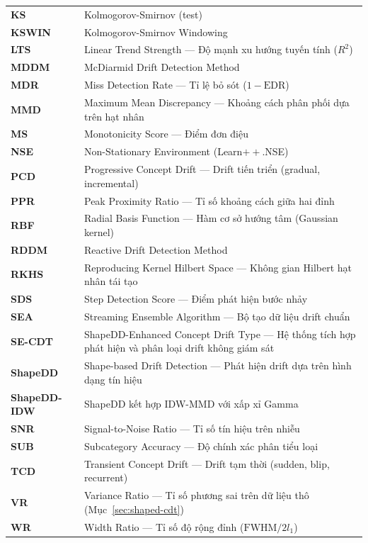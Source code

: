 \begin{longtable}[c]{|>{\bfseries}l|p{12cm}|}
	KS & Kolmogorov-Smirnov (test) \\
	KSWIN & Kolmogorov-Smirnov Windowing \\
	LTS & Linear Trend Strength --- Độ mạnh xu hướng tuyến tính ($R^2$) \\
	MDDM & McDiarmid Drift Detection Method \\
	MDR & Miss Detection Rate --- Tỉ lệ bỏ sót ($1 - \text{EDR}$) \\
	MMD & Maximum Mean Discrepancy --- Khoảng cách phân phối dựa trên hạt nhân \\
	MS & Monotonicity Score --- Điểm đơn điệu \\
	NSE & Non-Stationary Environment (Learn$++$.NSE) \\
	PCD & Progressive Concept Drift --- Drift tiến triển (gradual, incremental) \\
	PPR & Peak Proximity Ratio --- Tỉ số khoảng cách giữa hai đỉnh \\
	RBF & Radial Basis Function --- Hàm cơ sở hướng tâm (Gaussian kernel) \\
	RDDM & Reactive Drift Detection Method \\
	RKHS & Reproducing Kernel Hilbert Space --- Không gian Hilbert hạt nhân tái tạo \\
	SDS & Step Detection Score --- Điểm phát hiện bước nhảy \\
	SEA & Streaming Ensemble Algorithm --- Bộ tạo dữ liệu drift chuẩn \\
	SE-CDT & ShapeDD-Enhanced Concept Drift Type --- Hệ thống tích hợp phát hiện và phân loại drift không giám sát \\
	ShapeDD & Shape-based Drift Detection --- Phát hiện drift dựa trên hình dạng tín hiệu \\
	ShapeDD-IDW & ShapeDD kết hợp IDW-MMD với xấp xỉ Gamma \\
	SNR & Signal-to-Noise Ratio --- Tỉ số tín hiệu trên nhiễu \\
	SUB & Subcategory Accuracy --- Độ chính xác phân tiểu loại \\
	TCD & Transient Concept Drift --- Drift tạm thời (sudden, blip, recurrent) \\
	VR & Variance Ratio --- Tỉ số phương sai trên dữ liệu thô (Mục~\ref{sec:shaped-cdt}) \\
	WR & Width Ratio --- Tỉ số độ rộng đỉnh ($\text{FWHM} / 2l_1$) \\
	\hline
\end{longtable}

